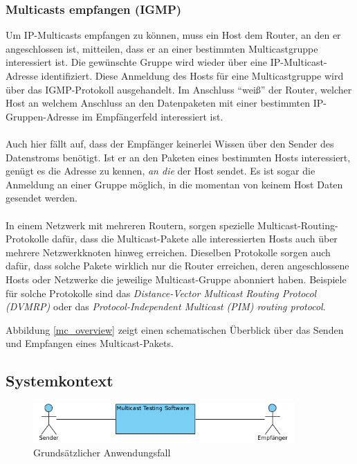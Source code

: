 \subsubsection{Multicasts empfangen (IGMP)}
Um IP-Multicasts empfangen zu können, muss ein Host dem Router, an den er
angeschlossen ist, mitteilen, dass er an einer bestimmten Multicastgruppe
interessiert ist. Die gewünschte Gruppe wird wieder über eine
IP-Multicast-Adresse identifiziert. Diese Anmeldung des Hosts für eine
Multicastgruppe wird über das IGMP-Protokoll ausgehandelt. Im Anschluss "`weiß"'
der Router, welcher Host an welchem Anschluss an den Datenpaketen mit einer
bestimmten IP-Gruppen-Adresse im Empfängerfeld interessiert ist.\\
\\
Auch hier fällt
auf, dass der Empfänger keinerlei Wissen über den Sender des Datenstroms
benötigt. Ist er an den Paketen eines bestimmten Hosts interessiert, genügt es
die Adresse zu kennen, \emph{an die} der Host sendet. Es ist sogar die Anmeldung
an einer Gruppe möglich, in die momentan von keinem Host Daten gesendet
werden.\\
\\
In einem Netzwerk mit mehreren Routern, sorgen spezielle
Multicast-Routing-Protokolle dafür, dass die Multicast-Pakete alle
interessierten Hosts auch über mehrere Netzwerkknoten hinweg erreichen.
Dieselben Protokolle sorgen auch dafür, dass solche Pakete wirklich nur die
Router erreichen, deren angeschlossene Hosts oder Netzwerke die jeweilige
Multicast-Gruppe abonniert haben. Beispiele für solche Protokolle sind das
\emph{Distance-Vector Multicast Routing Protocol (DVMRP)} oder das
\emph{Protocol-Independent Multicast (PIM) routing protocol}.

Abbildung \ref{mc_overview} zeigt einen schematischen Überblick über das Senden
und Empfangen eines Multicast-Pakets.

\subsection{Systemkontext}

\begin{figure}[H]
\includegraphics[width=10cm]{images/kontext-usecase.png}
\centering
\caption{Grundsätzlicher Anwendungsfall}
\end{figure}

